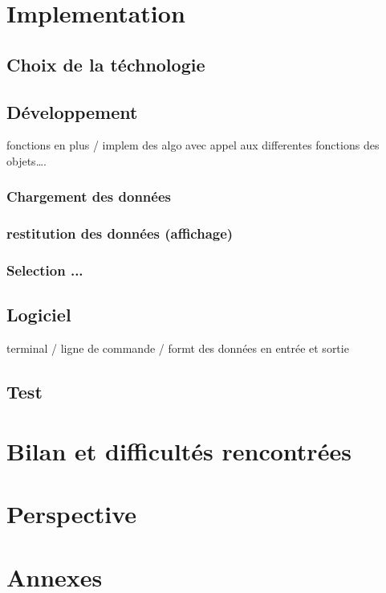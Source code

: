 \documentclass[oneside,13pt,a4paper]{report}
\begin{document}
\chapter{Implementation}

\section{Choix de la téchnologie}

\section{Développement}

fonctions en plus / implem des algo avec appel aux differentes fonctions des objets….

\subsection{Chargement des données}

\subsection{restitution des données (affichage)}

\subsection{Selection ...}

\section{Logiciel}

terminal / ligne de commande / formt des données en entrée et sortie

\section{Test}



\chapter{Bilan et difficultés rencontrées}


\chapter{Perspective}


\chapter{Annexes}
\end{document}
